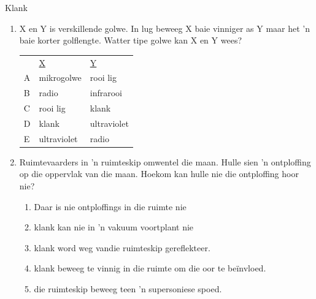 \begin{eocexercises}{Klank}
\begin{enumerate}[noitemsep, label=\textbf{\arabic*}. ]
\item X en Y is verskillende golwe. In lug beweeg X baie vinniger as Y maar het 'n baie korter golflengte. Watter tipe golwe kan X en Y wees? 
          \begin{table}[H]
        \begin{center}
      \label{m38800*id186268}
    \noindent
          \tablelasttail{}
      \begin{xtabular}[t]{|l|l|l|}\hline
         &
        \uline{X} &
        \uline{Y}%
     \tabularnewline{}
        A &
        mikrogolwe &
        rooi lig%
     \tabularnewline{}
        B &
        radio &
        infrarooi%
     \tabularnewline{}
        C &
        rooi lig &
        klank%
     \tabularnewline{}
        D &
        klank &
        ultraviolet%
     \tabularnewline{}
        E &
        ultraviolet &
        radio%
     \tabularnewline{}
    \end{xtabular}
      \end{center}
\end{table}
    \par

\item Ruimtevaarders in 'n ruimteskip omwentel die maan. Hulle sien 'n ontploffing op die oppervlak van die maan. Hoekom kan hulle nie die ontploffing hoor nie?
\begin{enumerate}[noitemsep, label=\textbf{\alph*}. ] 
    \item Daar is nie ontploffings in die ruimte nie
    \item klank kan nie in 'n vakuum voortplant nie
    \item klank word weg vandie ruimteskip gereflekteer.
    \item klank beweeg te vinnig in die ruimte om die oor te be\"invloed.
    \item die ruimteskip beweeg teen 'n supersoniese spoed.
\end{enumerate}


\end{enumerate}
\end{eocexercises}

